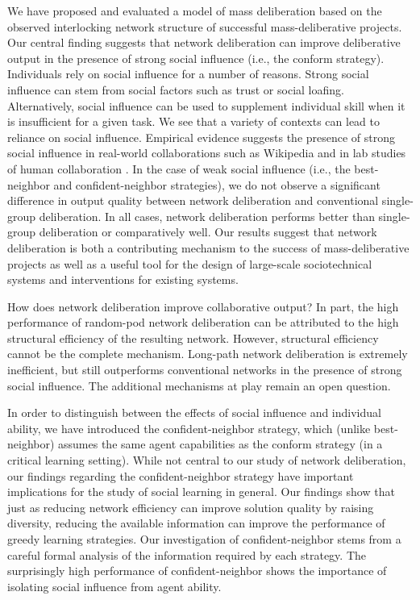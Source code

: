 We have proposed and evaluated a model of mass deliberation based on the observed interlocking network structure of successful mass-deliberative projects.
Our central finding suggests that network deliberation can improve deliberative output in the presence of strong social influence (i.e., the conform strategy).
Individuals rely on social influence for a number of reasons.
Strong social influence can stem from social factors such as trust or social loafing.
Alternatively, social influence can be used to supplement individual skill when it is insufficient for a given task.
We see that a variety of contexts can lead to reliance on social influence.
Empirical evidence suggests the presence of strong social influence in real-world collaborations such as Wikipedia \cite{platt_network_2018} and in lab studies of human collaboration \cite{mason_collaborative_2012, barkoczi_social_2016}.
In the case of weak social influence (i.e., the  best-neighbor and confident-neighbor strategies), we do not observe a significant difference in output quality between network deliberation and conventional single-group deliberation. In all cases, network deliberation performs better than single-group deliberation or comparatively well. 
Our results suggest that network deliberation is both a contributing mechanism to the success of mass-deliberative projects as well as a useful tool for the design of large-scale sociotechnical systems and interventions for existing systems.

How does network deliberation improve collaborative output? In part, the high performance of random-pod network deliberation can be attributed to the high structural efficiency of the resulting network. However, structural efficiency cannot be the complete mechanism. Long-path network deliberation is extremely inefficient, but still outperforms conventional networks in the presence of strong social influence. The additional mechanisms at play remain an open question.

In order to distinguish between the effects of social influence and individual ability, we have introduced the confident-neighbor strategy, which (unlike best-neighbor) assumes the same agent capabilities as the conform strategy (in a critical learning setting).
While not central to our study of network deliberation, our findings regarding the 
confident-neighbor strategy have important implications for the study of social learning in general. 
Our findings show that just as reducing network efficiency can improve solution quality by raising diversity, reducing the available information can improve the performance of greedy learning strategies. Our investigation of confident-neighbor stems from a careful formal analysis of the information required by each strategy. The surprisingly high performance of confident-neighbor shows the importance of isolating social influence from agent ability.

